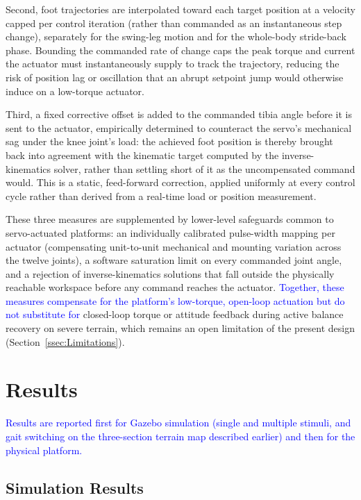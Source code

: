 \documentclass[preprint,12pt]{elsarticle}
\newcommand{\revblue}[1]{\textcolor{blue}{#1}}
\begin{document}
Second, foot trajectories are interpolated toward each target position at a velocity capped per control iteration (rather than commanded as an instantaneous step change), separately for the swing-leg motion and for the whole-body stride-back phase. Bounding the commanded rate of change caps the peak torque and current the actuator must instantaneously supply to track the trajectory, reducing the risk of position lag or oscillation that an abrupt setpoint jump would otherwise induce on a low-torque actuator.

Third, a fixed corrective offset is added to the commanded tibia angle before it is sent to the actuator, empirically determined to counteract the servo's mechanical sag under the knee joint's load: the achieved foot position is thereby brought back into agreement with the kinematic target computed by the inverse-kinematics solver, rather than settling short of it as the uncompensated command would. This is a static, feed-forward correction, applied uniformly at every control cycle rather than derived from a real-time load or position measurement.

These three measures are supplemented by lower-level safeguards common to servo-actuated platforms: an individually calibrated pulse-width mapping per actuator (compensating unit-to-unit mechanical and mounting variation across the twelve joints), a software saturation limit on every commanded joint angle, and a rejection of inverse-kinematics solutions that fall outside the physically reachable workspace before any command reaches the actuator. \revblue{Together, these measures compensate for the platform's low-torque, open-loop actuation but do not substitute for} closed-loop torque or attitude feedback during active balance recovery on severe terrain, which remains an open limitation of the present design (Section~\ref{ssec:Limitations}).

\section{Results}
\label{sec:results}

\revblue{Results are reported first for Gazebo simulation (single and multiple stimuli, and gait switching on the three-section terrain map described earlier) and then for the physical platform.} 

\subsection{Simulation Results}
\end{document}

